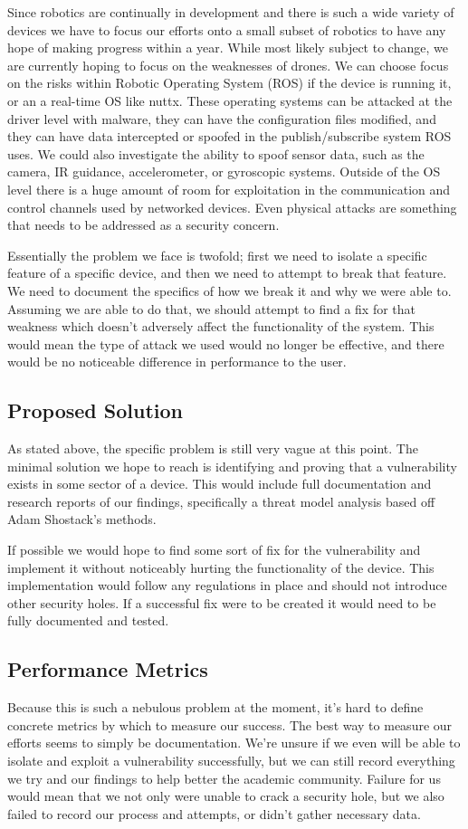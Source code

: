 \documentclass[IEEEtran,letterpaper,10pt,titlepage,draftclsnofoot,onecolumn]{article}
\begin{document}
Since robotics are continually in development and there is such a wide variety of devices we have to focus our efforts onto a small subset of robotics to have any hope of making progress within a year. 
While most likely subject to change, we are currently hoping to focus on the weaknesses of drones.
We can choose focus on the risks within Robotic Operating System (ROS) if the device is running it, or an a real-time OS like nuttx.
These operating systems can be attacked at the driver level with malware, they can have the configuration files modified, and they can have data intercepted or spoofed in the publish/subscribe system ROS uses.
We could also investigate the ability to spoof sensor data, such as the camera, IR guidance, accelerometer, or gyroscopic systems. 
Outside of the OS level there is a huge amount of room for exploitation in the communication and control channels used by networked devices. 
Even physical attacks are something that needs to be addressed as a security concern.

Essentially the problem we face is twofold; first we need to isolate a specific feature of a specific device, and then we need to attempt to break that feature. 
We need to document the specifics of how we break it and why we were able to.
Assuming we are able to do that, we should attempt to find a fix for that weakness which doesn't adversely affect the functionality of the system.
This would mean the type of attack we used would no longer be effective, and there would be no noticeable difference in performance to the user.

\subsection*{Proposed Solution}
As stated above, the specific problem is still very vague at this point.
The minimal solution we hope to reach is identifying and proving that a vulnerability exists in some sector of a device.
This would include full documentation and research reports of our findings, specifically a threat model analysis based off Adam Shostack's methods. \cite[p.203]{TMDS}

If possible we would hope to find some sort of fix for the vulnerability and implement it without noticeably hurting the functionality of the device.
This implementation would follow any regulations in place and should not introduce other security holes.
If a successful fix were to be created it would need to be fully documented and tested.

\subsection*{Performance Metrics}
Because this is such a nebulous problem at the moment, it's hard to define concrete metrics by which to measure our success.
The best way to measure our efforts seems to simply be documentation.
We're unsure if we even will be able to isolate and exploit a vulnerability successfully, but we can still record everything we try and our findings to help better the academic community. 
Failure for us would mean that we not only were unable to crack a security hole, but we also failed to record our process and attempts, or didn't gather necessary data.




\end{document}
